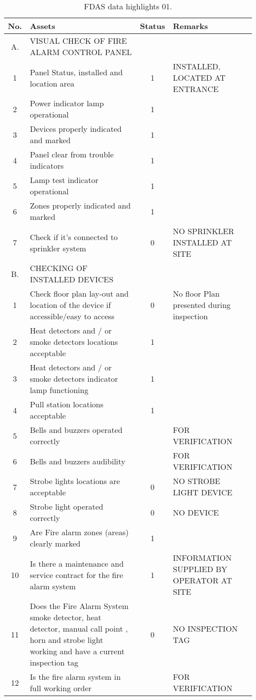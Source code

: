 \begin{table}[!h]
	\caption{FDAS data highlights 01.}
	\label{ch04_tbl_fdas01}
	{\scriptsize
\begin{tabular}{c|p{6.5cm}|c|p{5.5cm}}
	\hline
	No. & Assets & Status & Remarks \\ 
\hline
A. & VISUAL CHECK OF FIRE ALARM CONTROL PANEL &  &  \\ 
1 & Panel Status, installed and location area & 1 & INSTALLED, LOCATED AT ENTRANCE \\ 
2 & Power indicator lamp operational & 1 &  \\ 
3 & Devices properly indicated and marked & 1 &  \\ 
4 & Panel clear from trouble indicators & 1 &  \\ 
5 & Lamp test indicator operational & 1 &  \\ 
6 & Zones properly indicated and marked & 1 &  \\ 
7 & Check if it’s connected to sprinkler system & 0 & NO SPRINKLER INSTALLED AT SITE \\ 
\hline
B. & CHECKING OF INSTALLED DEVICES &  &  \\ 
1 & Check floor plan lay-out and location of the device if accessible/easy to access & 0 & No floor Plan presented during inspection \\ 
2 & Heat detectors and / or smoke detectors locations acceptable & 1 &  \\ 
3 & Heat detectors and / or smoke detectors indicator lamp functioning & 1 &  \\ 
4 & Pull station locations acceptable & 1 &  \\ 
5 & Bells and buzzers operated correctly &  & FOR VERIFICATION \\ 
6 & Bells and buzzers audibility &  & FOR VERIFICATION \\ 
7 & Strobe lights locations are acceptable & 0 & NO STROBE LIGHT DEVICE \\ 
8 & Strobe light operated correctly & 0 & NO DEVICE \\ 
9 & Are Fire alarm zones (areas) clearly marked & 1 &  \\ 
10 & Is there a maintenance and service contract for the fire alarm system & 1 & INFORMATION SUPPLIED BY OPERATOR AT SITE \\ 
11 & Does the Fire Alarm System smoke detector, heat detector, manual call point , horn and strobe light working and  have a current inspection tag & 0 & NO INSPECTION TAG \\ 
12 & Is the fire alarm system in full working order &  & FOR VERIFICATION \\ 
\hline
\end{tabular}

	}
\end{table}